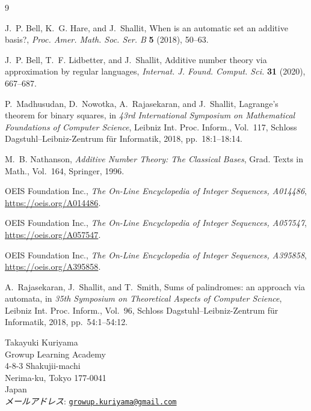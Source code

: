 \documentclass[12pt]{ltjsarticle}
\theoremstyle{plain}
\theoremstyle{definition}
\theoremstyle{plain}
\begin{document}
\begin{thebibliography}{9}

J.~P. Bell, K.~G. Hare, and J.~Shallit,
When is an automatic set an additive basis?,
\emph{Proc. Amer. Math. Soc. Ser. B} \textbf{5} (2018), 50--63.

J.~P. Bell, T.~F. Lidbetter, and J.~Shallit,
Additive number theory via approximation by regular languages,
\emph{Internat. J. Found. Comput. Sci.} \textbf{31} (2020), 667--687.

P.~Madhusudan, D.~Nowotka, A.~Rajasekaran, and J.~Shallit,
Lagrange's theorem for binary squares,
in \emph{43rd International Symposium on Mathematical Foundations of
Computer Science}, Leibniz Int. Proc. Inform., Vol.~117, Schloss
Dagstuhl--Leibniz-Zentrum f{\"u}r Informatik, 2018, pp.~18:1--18:14.

M.~B. Nathanson,
\emph{Additive Number Theory: The Classical Bases},
Grad. Texts in Math., Vol.~164, Springer, 1996.

OEIS Foundation Inc.,
\emph{The On-Line Encyclopedia of Integer Sequences, A014486},
\url{https://oeis.org/A014486}.

OEIS Foundation Inc.,
\emph{The On-Line Encyclopedia of Integer Sequences, A057547},
\url{https://oeis.org/A057547}.

OEIS Foundation Inc.,
\emph{The On-Line Encyclopedia of Integer Sequences, A395858},
\url{https://oeis.org/A395858}.

A.~Rajasekaran, J.~Shallit, and T.~Smith,
Sums of palindromes: an approach via automata,
in \emph{35th Symposium on Theoretical Aspects of Computer Science},
Leibniz Int. Proc. Inform., Vol.~96, Schloss Dagstuhl--Leibniz-Zentrum
f{\"u}r Informatik, 2018, pp.~54:1--54:12.

\end{thebibliography}

\begin{flushleft}
Takayuki Kuriyama\\
Growup Learning Academy\\
4-8-3 Shakujii-machi\\
Nerima-ku, Tokyo 177-0041\\
Japan\\
\textit{メールアドレス}: \href{mailto:growup.kuriyama@gmail.com}
{\texttt{growup.kuriyama@gmail.com}}
\end{flushleft}
\end{document}
